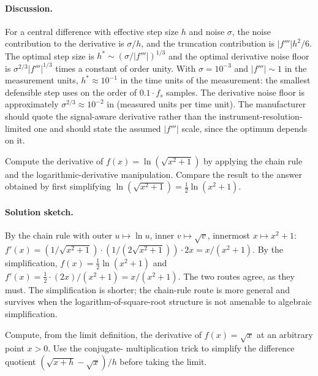 \paragraph{Discussion.}
For a central difference with effective step size $h$ and noise
$\sigma$, the noise contribution to the derivative is $\sigma /
h$, and the truncation contribution is $|f'''| h^{2}/6$. The
optimal step size is $h^{*} \sim (\sigma / |f'''|)^{1/3}$ and
the optimal derivative noise floor is $\sigma^{2/3}
|f'''|^{1/3}$ times a constant of order unity. With $\sigma =
10^{-3}$ and $|f'''| \sim 1$ in the measurement units, $h^{*}
\approx 10^{-1}$ in the time units of the measurement: the
smallest defensible step uses on the order of $0.1 \cdot f_{s}$
samples. The derivative noise floor is approximately
$\sigma^{2/3} \approx 10^{-2}$ in (measured units per time
unit). The manufacturer should quote the signal-aware derivative
rather than the instrument-resolution-limited one and should
state the assumed $|f'''|$ scale, since the optimum depends on
it.

\begin{exercise}
Compute the derivative of $f(x) = \ln(\sqrt{x^{2} + 1})$ by
applying the chain rule and the logarithmic-derivative
manipulation. Compare the result to the answer obtained by first
simplifying $\ln(\sqrt{x^{2} + 1}) = \tfrac{1}{2}\ln(x^{2} + 1)$.
\end{exercise}

\paragraph{Solution sketch.}
By the chain rule with outer $u \mapsto \ln u$, inner $v \mapsto
\sqrt{v}$, innermost $x \mapsto x^{2} + 1$:
$f'(x) = (1/\sqrt{x^{2} + 1}) \cdot (1/(2\sqrt{x^{2} + 1})) \cdot
2 x = x / (x^{2} + 1)$. By the simplification, $f(x) =
\tfrac{1}{2} \ln(x^{2} + 1)$ and $f'(x) = \tfrac{1}{2} \cdot
(2 x)/(x^{2} + 1) = x/(x^{2} + 1)$. The two routes agree, as
they must. The simplification is shorter; the chain-rule route
is more general and survives when the logarithm-of-square-root
structure is not amenable to algebraic simplification.

\begin{exercise}
Compute, from the limit definition, the derivative of $f(x) =
\sqrt{x}$ at an arbitrary point $x > 0$. Use the conjugate-
multiplication trick to simplify the difference quotient
$(\sqrt{x + h} - \sqrt{x})/h$ before taking the limit.
\end{exercise}

